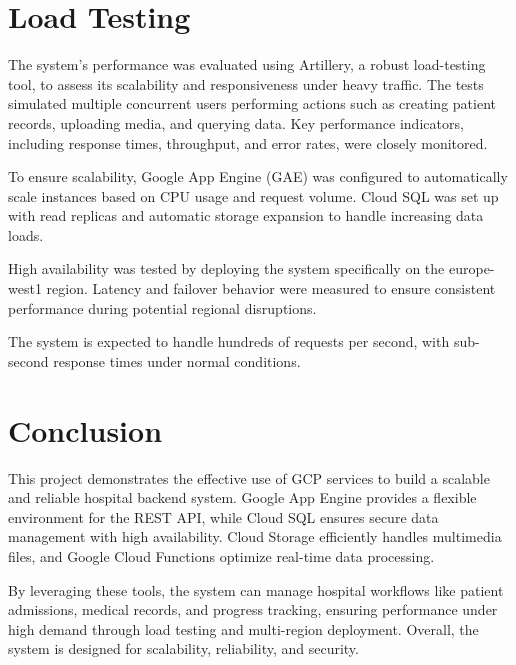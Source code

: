 \documentclass[12pt,a4paper]{article}
\begin{document}
\section{Load Testing}
The system's performance was evaluated using Artillery, a robust load-testing tool, to assess its scalability and responsiveness under heavy traffic. The tests simulated multiple concurrent users performing actions such as creating patient records, uploading media, and querying data. Key performance indicators, including response times, throughput, and error rates, were closely monitored.

To ensure scalability, Google App Engine (GAE) was configured to automatically scale instances based on CPU usage and request volume. Cloud SQL was set up with read replicas and automatic storage expansion to handle increasing data loads.

High availability was tested by deploying the system specifically on the europe-west1 region. Latency and failover behavior were measured to ensure consistent performance during potential regional disruptions.

The system is expected to handle hundreds of requests per second, with sub-second response times under normal conditions.

\section{Conclusion}
This project demonstrates the effective use of GCP services to build a scalable and reliable hospital backend system. Google App Engine provides a flexible environment for the REST API, while Cloud SQL ensures secure data management with high availability. Cloud Storage efficiently handles multimedia files, and Google Cloud Functions optimize real-time data processing.

By leveraging these tools, the system can manage hospital workflows like patient admissions, medical records, and progress tracking, ensuring performance under high demand through load testing and multi-region deployment. Overall, the system is designed for scalability, reliability, and security.
\end{document}
